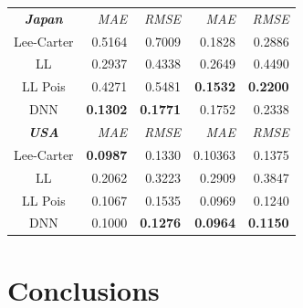\documentclass[a4,11pt]{article}
\begin{document}
\begin{table}[H]
\begin{tabular}{crrrr}
\midrule
			\textbf{\textit{Japan}}       &   \textit{MAE} & \textit{RMSE} &  \textit{MAE} & \textit{RMSE}\\
                	Lee-Carter                       &  0.5164    &   0.7009        &	 0.1828   &   0.2886\\	
                   	LL                                   &  0.2937    &   0.4338 	&      0.2649    &   0.4490	\\	
			LL Pois                            &  0.4271    &   0.5481  	&      \textbf{0.1532}    &   \textbf{0.2200}	\\			
			DNN                                &  \textbf{0.1302}    &   \textbf{0.1771}   	&      0.1752    &   0.2338	\\
\midrule
	            	\textbf{\textit{USA}}        &   \textit{MAE} & \textit{RMSE} & \textit{MAE} & \textit{RMSE} \\
                 	Lee-Carter                      & \textbf{0.0987}  &   0.1330          &	0.10363   &    0.1375	\\	
                   	LL                                  &  0.2062  &   0.3223   	&      0.2909   &    0.3847	\\	
			LL Pois                           &	 0.1067  &   0.1535   	&      0.0969   &    0.1240	\\			
			DNN                               &  0.1000  &   \textbf{0.1276}   	&     \textbf{0.0964}   &    \textbf{0.1150}	\\
\bottomrule
\end{tabular}
\label{tab:1}
\end{table}	

\section{Conclusions}
\end{document}
